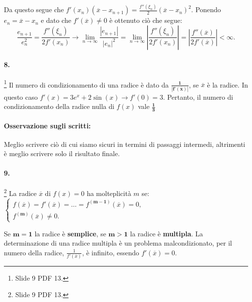 \addtocounter{footnote}{-1}


\noindent Da questo segue che $f'(x_n)(\overline{x}-x_{n+1})=\frac{f''(\xi_n)}{2}(\overline{x}-x_n)^2.$ Ponendo $e_n=\overline{x}-x_n$ e dato che $f'(\overline{x})\neq 0$ è ottenuto ciò che segue: 
\begin{equation*}
	\frac{e_{n+1}}{e_n^2}=\frac{f''(\xi_n)}{2f'(x_n)}\longrightarrow\lim_{n\rightarrow\infty}\frac{|e_{n+1}|}{|e_n|^2}=\lim_{n\rightarrow\infty}\left|\frac{f''(\xi_n)}{2f'(x_n)}\right|=\left|\frac{f''(\overline{x})}{2f'(\overline{x})}\right|<\infty.
\end{equation*}

\paragraph{8.}\footnote{Slide 9 PDF 13.} Il numero di condizionamento di una radice è dato da $\boldsymbol{\frac{1}{|f'(\overline{x})|}}$, se $\overline{x}$ è la radice. In questo caso $f'(x)=3e^x+2\sin{(x)}\rightarrow f'(0)=3$. Pertanto, il numero di condizionamento della radice nulla di $f(x)$ vale $\boldsymbol{\frac{1}{3}}$

\paragraph{Osservazione sugli scritti:} Meglio scrivere ciò di cui siamo sicuri in termini di passaggi intermedi, altrimenti è meglio scrivere solo il risultato finale.

\paragraph{9.}\footnote{Slide 9 PDF 13.} La radice $\overline{x}$ di $f(x)=0$ ha molteplicità $m$ se:
$\begin{cases}
	f(\overline{x})=f'(\overline{x})=\hdots=f^{(\boldsymbol{m-1})}(\overline{x})=0,\\
	f^{(\boldsymbol m)}(\overline{x})\neq 0.
\end{cases}$

\noindent Se $\boldsymbol{m=1}$ la radice è \textbf{semplice}, se $\boldsymbol{m>1}$ la radice è \textbf{multipla}. La determinazione di una radice multipla è un problema malcondizionato, per il numero della radice, $\frac{1}{f'(\overline{x})}$, è infinito, essendo $f'(\overline{x})=0$. 

